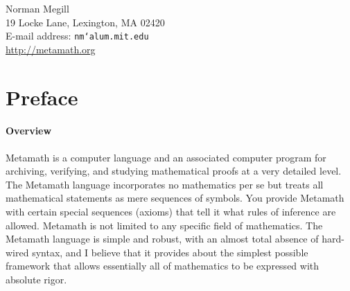 \begin{center}
\hfill
\vfill

Norman Megill\\ 19 Locke Lane, Lexington, MA 02420 \\
E-mail address: \texttt{nm{\char`\@}alum.mit.edu} \\
\url{http://metamath.org}
\end{center}

%
%
%
%

\tableofcontents

\chapter*{Preface}



\subsubsection{Overview}

Metamath is a computer language and an associated computer
program for archiving, verifying, and studying mathematical proofs at a very
detailed level.  The Metamath language incorporates no mathematics per se but
treats all mathematical statements as mere sequences of symbols.  You provide
Metamath with certain special sequences (axioms) that tell it what rules
of inference are allowed.  Metamath is not limited to any specific field of
mathematics.  The Metamath language is simple and robust, with an
almost total absence of hard-wired syntax, and I believe that it
provides about the simplest possible framework that allows essentially all of
mathematics to be expressed with absolute rigor.


